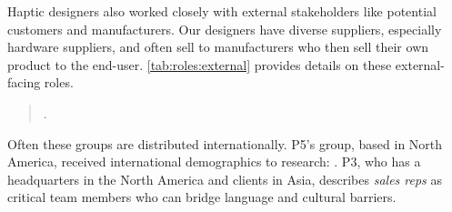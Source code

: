 Haptic designers also worked closely with external stakeholders like potential customers and manufacturers.
Our designers have diverse suppliers, especially hardware suppliers, and often sell to manufacturers who then sell their own product to the end-user.
\autoref{tab:roles:external} provides details on these external-facing roles.

\begin{quote}
.
\end{quote}

Often these groups are distributed internationally.
P5's group, based in North America, received international demographics to research: .
P3, who has a headquarters in the North America and clients in Asia, describes \emph{sales reps} as critical team members who can bridge language and cultural barriers. %



